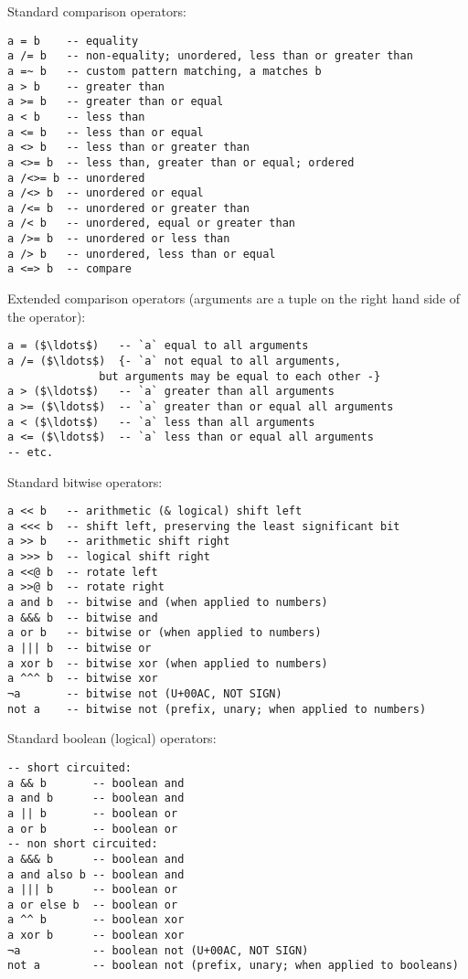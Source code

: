 Standard comparison operators:
\begin{lstlisting}
a = b    -- equality
a /= b   -- non-equality; unordered, less than or greater than
a =~ b   -- custom pattern matching, a matches b
a > b    -- greater than
a >= b   -- greater than or equal
a < b    -- less than
a <= b   -- less than or equal
a <> b   -- less than or greater than
a <>= b  -- less than, greater than or equal; ordered
a /<>= b -- unordered
a /<> b  -- unordered or equal
a /<= b  -- unordered or greater than
a /< b   -- unordered, equal or greater than
a />= b  -- unordered or less than
a /> b   -- unordered, less than or equal
a <=> b  -- compare
\end{lstlisting}

Extended comparison operators (arguments are a tuple on the right hand side of the operator):
\begin{lstlisting}
a = ($\ldots$)   -- `a` equal to all arguments
a /= ($\ldots$)  {- `a` not equal to all arguments,
              but arguments may be equal to each other -}
a > ($\ldots$)   -- `a` greater than all arguments
a >= ($\ldots$)  -- `a` greater than or equal all arguments
a < ($\ldots$)   -- `a` less than all arguments
a <= ($\ldots$)  -- `a` less than or equal all arguments
-- etc.
\end{lstlisting}

Standard bitwise operators: 
\begin{lstlisting}
a << b   -- arithmetic (& logical) shift left
a <<< b  -- shift left, preserving the least significant bit
a >> b   -- arithmetic shift right
a >>> b  -- logical shift right
a <<@ b  -- rotate left
a >>@ b  -- rotate right
a and b  -- bitwise and (when applied to numbers)
a &&& b  -- bitwise and
a or b   -- bitwise or (when applied to numbers)
a ||| b  -- bitwise or
a xor b  -- bitwise xor (when applied to numbers)
a ^^^ b  -- bitwise xor
¬a       -- bitwise not (U+00AC, NOT SIGN)
not a    -- bitwise not (prefix, unary; when applied to numbers)
\end{lstlisting}

Standard boolean (logical) operators:
\begin{lstlisting}
-- short circuited:
a && b       -- boolean and
a and b      -- boolean and
a || b       -- boolean or
a or b       -- boolean or
-- non short circuited:
a &&& b      -- boolean and
a and also b -- boolean and
a ||| b      -- boolean or
a or else b  -- boolean or
a ^^ b       -- boolean xor
a xor b      -- boolean xor
¬a           -- boolean not (U+00AC, NOT SIGN)
not a        -- boolean not (prefix, unary; when applied to booleans)
\end{lstlisting}

